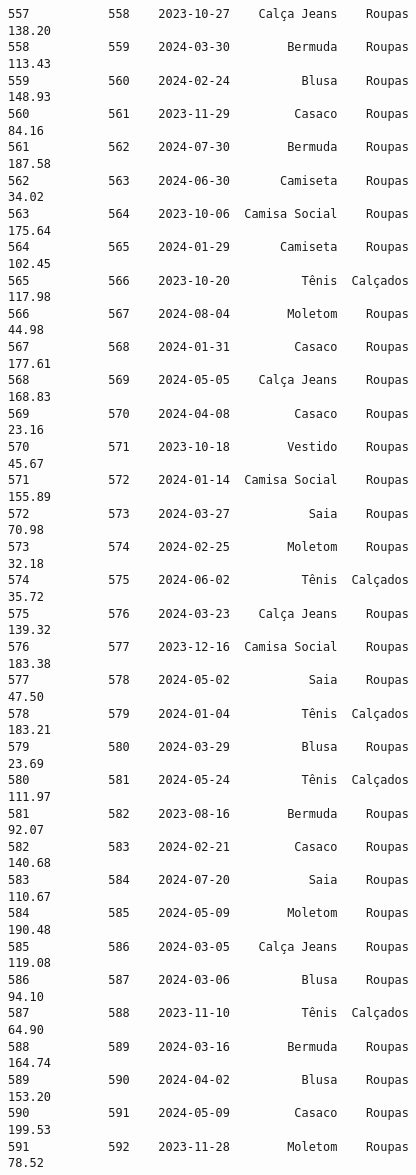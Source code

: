 \documentclass[11pt]{article}
\begin{document}
\begin{Verbatim}[commandchars=\\\{\}]
557           558    2023-10-27    Calça Jeans    Roupas          138.20   
558           559    2024-03-30        Bermuda    Roupas          113.43   
559           560    2024-02-24          Blusa    Roupas          148.93   
560           561    2023-11-29         Casaco    Roupas           84.16   
561           562    2024-07-30        Bermuda    Roupas          187.58   
562           563    2024-06-30       Camiseta    Roupas           34.02   
563           564    2023-10-06  Camisa Social    Roupas          175.64   
564           565    2024-01-29       Camiseta    Roupas          102.45   
565           566    2023-10-20          Tênis  Calçados          117.98   
566           567    2024-08-04        Moletom    Roupas           44.98   
567           568    2024-01-31         Casaco    Roupas          177.61   
568           569    2024-05-05    Calça Jeans    Roupas          168.83   
569           570    2024-04-08         Casaco    Roupas           23.16   
570           571    2023-10-18        Vestido    Roupas           45.67   
571           572    2024-01-14  Camisa Social    Roupas          155.89   
572           573    2024-03-27           Saia    Roupas           70.98   
573           574    2024-02-25        Moletom    Roupas           32.18   
574           575    2024-06-02          Tênis  Calçados           35.72   
575           576    2024-03-23    Calça Jeans    Roupas          139.32   
576           577    2023-12-16  Camisa Social    Roupas          183.38   
577           578    2024-05-02           Saia    Roupas           47.50   
578           579    2024-01-04          Tênis  Calçados          183.21   
579           580    2024-03-29          Blusa    Roupas           23.69   
580           581    2024-05-24          Tênis  Calçados          111.97   
581           582    2023-08-16        Bermuda    Roupas           92.07   
582           583    2024-02-21         Casaco    Roupas          140.68   
583           584    2024-07-20           Saia    Roupas          110.67   
584           585    2024-05-09        Moletom    Roupas          190.48   
585           586    2024-03-05    Calça Jeans    Roupas          119.08   
586           587    2024-03-06          Blusa    Roupas           94.10   
587           588    2023-11-10          Tênis  Calçados           64.90   
588           589    2024-03-16        Bermuda    Roupas          164.74   
589           590    2024-04-02          Blusa    Roupas          153.20   
590           591    2024-05-09         Casaco    Roupas          199.53   
591           592    2023-11-28        Moletom    Roupas           78.52   

\end{Verbatim}
\end{document}
